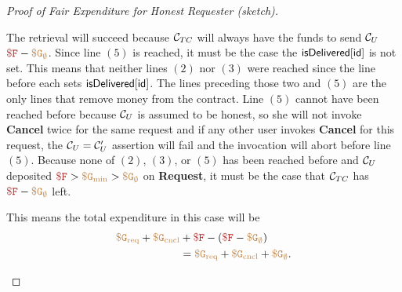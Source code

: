 \begin{proof}[Proof of Fair Expenditure for Honest Requester (sketch)]
\begin{itemize}
The retrieval will succeed because ${\cal C}_{TC}$ will always have the funds to send ${\cal C}_U$ $\consthonestfee - \constgascancel$.
Since line $(5)$ is reached, it must be the case the ${\sf isDelivered}[{\sf id}]$ is not set.
This means that neither lines $(2)$ nor $(3)$ were reached since the line before each sets ${\sf isDelivered}[{\sf id}]$.
The lines preceding those two and $(5)$ are the only lines that remove money from the contract.
Line $(5)$ cannot have been reached before because ${\cal C}_U$ is assumed to be honest, so she will not invoke {\bf Cancel} twice for the same request
and if any other user invokes {\bf Cancel} for this request, the ${\cal C}_U = {\cal C}_U'$ assertion will fail and the invocation will abort before line $(5)$.
Because none of $(2)$, $(3)$, or $(5)$ has been reached before and ${\cal C}_U$ deposited $\consthonestfee > \constgasmin > \constgascancel$ on {\bf Request},
it must be the case that ${\cal C}_{TC}$ has $\consthonestfee - \constgascancel$ left.

This means the total expenditure in this case will be
\begin{align*}
  \constgasrequest + \constgasinvokecancel & + \consthonestfee - (\consthonestfee - \constgascancel) \\
                                           & = \constgasrequest + \constgasinvokecancel + \constgascancel.
\end{align*}
\end{itemize}
\end{proof}

